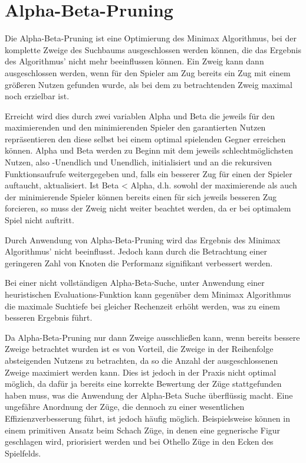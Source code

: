 \section{Alpha-Beta-Pruning}

Die Alpha-Beta-Pruning ist eine Optimierung des Minimax Algorithmus, bei der komplette Zweige des Suchbaums ausgeschlossen werden können, die das Ergebnis des Algorithmus' nicht mehr beeinflussen können.
Ein Zweig kann dann ausgeschlossen werden, wenn für den Spieler am Zug bereits ein Zug mit einem größeren Nutzen gefunden wurde, als bei dem zu betrachtenden Zweig maximal noch erzielbar ist.

Erreicht wird dies durch zwei variablen Alpha und Beta die jeweils für den maximierenden und den minimierenden Spieler den garantierten Nutzen repräsentieren den diese selbst bei einem optimal spielenden Gegner
erreichen können. Alpha und Beta werden zu Beginn mit dem jeweils schlechtmöglichsten Nutzen, also -Unendlich und Unendlich, initialisiert und an die rekursiven Funktionsaufrufe weitergegeben und, falls ein besserer Zug
für einen der Spieler auftaucht, aktualisiert.
Ist Beta < Alpha, d.h. sowohl der maximierende als auch der minimierende Spieler können bereits einen für sich jeweils besseren Zug forcieren, so muss der Zweig nicht weiter beachtet werden, da er bei optimalem Spiel nicht auftritt.

Durch Anwendung von Alpha-Beta-Pruning wird das Ergebnis des Minimax Algorithmus' nicht beeinflusst. Jedoch kann durch die Betrachtung einer geringeren Zahl von Knoten die Performanz signifikant verbessert werden.

Bei einer nicht vollständigen Alpha-Beta-Suche, unter Anwendung einer heuristischen Evaluations-Funktion kann gegenüber dem Minimax Algorithmus die maximale Suchtiefe bei gleicher Rechenzeit erhöht werden, was zu einem besseren Ergebnis führt.

Da Alpha-Beta-Pruning nur dann Zweige ausschließen kann, wenn bereits bessere Zweige betrachtet wurden ist es von Vorteil, die Zweige in der Reihenfolge absteigenden Nutzens zu betrachten, da so die Anzahl der ausgeschlossenen
Zweige maximiert werden kann.
Dies ist jedoch in der Praxis nicht optimal möglich, da dafür ja bereits eine korrekte Bewertung der Züge stattgefunden haben muss, was die Anwendung der Alpha-Beta Suche überflüssig macht.
Eine ungefähre Anordnung der Züge, die dennoch zu einer wesentlichen Effizienzverbesserung führt, ist jedoch häufig möglich.
Beispielsweise können in einem primitiven Ansatz beim Schach Züge, in denen eine gegnerische Figur geschlagen wird, priorisiert werden und bei Othello Züge in den Ecken des Spielfelds.

